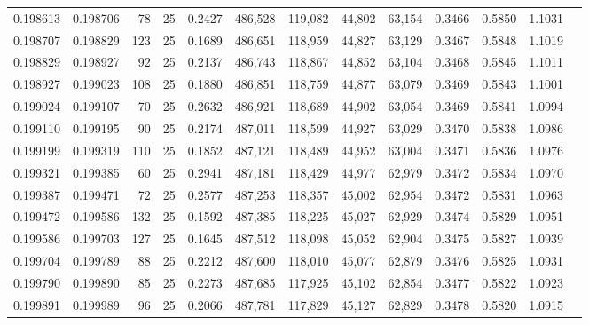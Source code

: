 \begin{tabular}{rrrrrrrrrrrrr}
0.198613 & 0.198706 &    78 &  25 &                                     0.2427 & 486,528 & 119,082 &  44,802 &  63,154 & 0.3466 & 0.5850 & 1.1031 \\
0.198707 & 0.198829 &   123 &  25 &                                     0.1689 & 486,651 & 118,959 &  44,827 &  63,129 & 0.3467 & 0.5848 & 1.1019 \\
0.198829 & 0.198927 &    92 &  25 &                                     0.2137 & 486,743 & 118,867 &  44,852 &  63,104 & 0.3468 & 0.5845 & 1.1011 \\
0.198927 & 0.199023 &   108 &  25 &                                     0.1880 & 486,851 & 118,759 &  44,877 &  63,079 & 0.3469 & 0.5843 & 1.1001 \\
0.199024 & 0.199107 &    70 &  25 &                                     0.2632 & 486,921 & 118,689 &  44,902 &  63,054 & 0.3469 & 0.5841 & 1.0994 \\
0.199110 & 0.199195 &    90 &  25 &                                     0.2174 & 487,011 & 118,599 &  44,927 &  63,029 & 0.3470 & 0.5838 & 1.0986 \\
0.199199 & 0.199319 &   110 &  25 &                                     0.1852 & 487,121 & 118,489 &  44,952 &  63,004 & 0.3471 & 0.5836 & 1.0976 \\
0.199321 & 0.199385 &    60 &  25 &                                     0.2941 & 487,181 & 118,429 &  44,977 &  62,979 & 0.3472 & 0.5834 & 1.0970 \\
0.199387 & 0.199471 &    72 &  25 &                                     0.2577 & 487,253 & 118,357 &  45,002 &  62,954 & 0.3472 & 0.5831 & 1.0963 \\
0.199472 & 0.199586 &   132 &  25 &                                     0.1592 & 487,385 & 118,225 &  45,027 &  62,929 & 0.3474 & 0.5829 & 1.0951 \\
0.199586 & 0.199703 &   127 &  25 &                                     0.1645 & 487,512 & 118,098 &  45,052 &  62,904 & 0.3475 & 0.5827 & 1.0939 \\
0.199704 & 0.199789 &    88 &  25 &                                     0.2212 & 487,600 & 118,010 &  45,077 &  62,879 & 0.3476 & 0.5825 & 1.0931 \\
0.199790 & 0.199890 &    85 &  25 &                                     0.2273 & 487,685 & 117,925 &  45,102 &  62,854 & 0.3477 & 0.5822 & 1.0923 \\
0.199891 & 0.199989 &    96 &  25 &                                     0.2066 & 487,781 & 117,829 &  45,127 &  62,829 & 0.3478 & 0.5820 & 1.0915 \\

\end{tabular}
